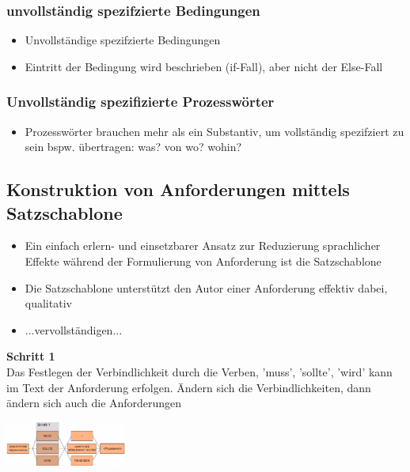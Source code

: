 \documentclass{report}
\newenvironment{Figure}
	{\par\medskip\noindent\minipage{\linewidth}}
	{\endminipage\par\medskip}
\theoremstyle{definition}
\theoremstyle{example}
\begin{document}
\subsubsection{unvollständig spezifzierte Bedingungen}
\begin{itemize}
   \item Unvollständige spezifzierte Bedingungen
   \item Eintritt der Bedingung wird beschrieben (if-Fall), aber nicht der Else-Fall
\end{itemize}

\subsubsection{Unvollständig spezifizierte Prozesswörter}
\begin{itemize}
   \item Prozesswörter brauchen mehr als ein Substantiv, um vollständig spezifziert zu sein
   \subitem bspw. übertragen: was? von wo? wohin?
\end{itemize}

\subsection{Konstruktion von Anforderungen mittels Satzschablone}
\begin{itemize}
   \item Ein einfach erlern- und einsetzbarer Ansatz zur Reduzierung sprachlicher Effekte während der Formulierung von Anforderung ist die Satzschablone
   \item Die Satzschablone unterstützt den Autor einer Anforderung effektiv dabei, qualitativ
   \item ...vervollständigen...
\end{itemize}

\textbf{Schritt 1}\\
Das Festlegen der Verbindlichkeit durch die Verben, 'muss', 'sollte', 'wird' kann im Text der Anforderung erfolgen. Ändern sich die Verbindlichkeiten, dann ändern sich auch die Anforderungen

\begin{Figure}
   \centering
    \includegraphics[width=150px]{img/SatzSchablone1.png}
        \label{fig:Schritt eins der Satzschablone}
\end{Figure}
\end{document}
